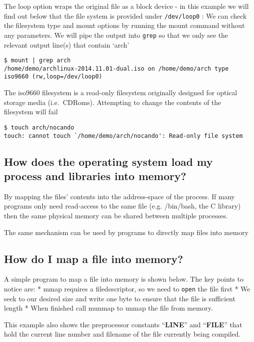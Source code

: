 The loop option wraps the original file as a block device - in this
example we will find out below that the file system is provided under
\texttt{/dev/loop0} : We can check the filesystem type and mount options
by running the mount command without any parameters. We will pipe the
output into \texttt{grep} so that we only see the relevant output
line(s) that contain `arch'

\begin{verbatim}
$ mount | grep arch
/home/demo/archlinux-2014.11.01-dual.iso on /home/demo/arch type iso9660 (rw,loop=/dev/loop0)
\end{verbatim}

The iso9660 filesystem is a read-only filesystem originally designed for
optical storage media (i.e.~CDRoms). Attempting to change the contents
of the filesystem will fail

\begin{verbatim}
$ touch arch/nocando
touch: cannot touch `/home/demo/arch/nocando': Read-only file system
\end{verbatim}

\subsection{How does the operating system load my process and libraries
into
memory?}\label{how-does-the-operating-system-load-my-process-and-libraries-into-memory}

By mapping the files' contents into the address-space of the process. If
many programs only need read-access to the same file (e.g. /bin/bash,
the C library) then the same physical memory can be shared between
multiple processes.

The same mechanism can be used by programs to directly map files into
memory

\subsection{How do I map a file into
memory?}\label{how-do-i-map-a-file-into-memory}

A simple program to map a file into memory is shown below. The key
points to notice are: * mmap requires a filedescriptor, so we need to
\texttt{open} the file first * We seek to our desired size and write one
byte to ensure that the file is sufficient length * When finished call
munmap to unmap the file from memory.

This example also shows the preprocessor constants ``\textbf{LINE}'' and
``\textbf{FILE}'' that hold the current line number and filename of the
file currently being compiled.

